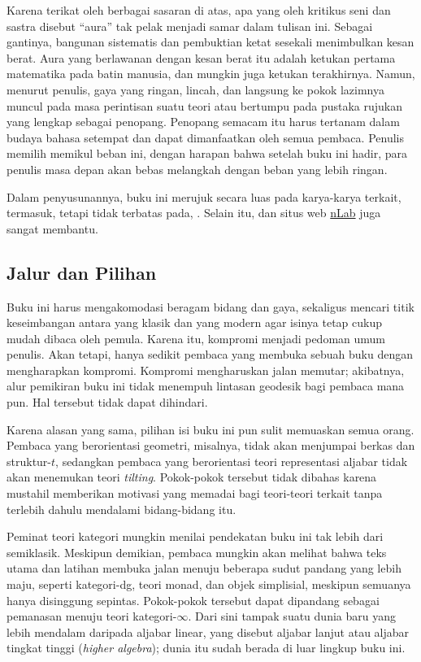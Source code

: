 Karena terikat oleh berbagai sasaran di atas, apa yang oleh kritikus seni
dan sastra disebut ``aura'' tak pelak menjadi samar dalam tulisan ini. Sebagai
gantinya, bangunan sistematis dan pembuktian ketat sesekali menimbulkan
kesan berat. Aura yang berlawanan dengan kesan berat itu adalah
ketukan pertama matematika pada batin manusia, dan mungkin juga ketukan
terakhirnya. Namun, menurut penulis, gaya yang ringan, lincah, dan langsung
ke pokok lazimnya muncul pada masa perintisan suatu teori atau bertumpu
pada pustaka rujukan yang lengkap sebagai penopang. Penopang semacam itu
harus tertanam dalam budaya bahasa setempat dan dapat dimanfaatkan oleh
semua pembaca. Penulis memilih memikul beban ini, dengan harapan bahwa
setelah buku ini hadir, para penulis masa depan akan bebas melangkah
dengan beban yang lebih ringan.

Dalam penyusunannya, buku ini merujuk secara luas pada karya-karya terkait,
termasuk, tetapi tidak terbatas pada, \cite{Wei94, ML98, KS06, Rie16, Yek20}.
Selain itu, \cite{stacks} dan situs web
\href{https://ncatlab.org}{nLab} juga sangat membantu.

\subsection*{Jalur dan Pilihan}

Buku ini harus mengakomodasi beragam bidang dan gaya, sekaligus mencari
titik keseimbangan antara yang klasik dan yang modern agar isinya tetap
cukup mudah dibaca oleh pemula. Karena itu, kompromi
menjadi pedoman umum penulis. Akan tetapi, hanya sedikit pembaca yang
membuka sebuah buku dengan mengharapkan kompromi. Kompromi mengharuskan jalan
memutar; akibatnya, alur pemikiran buku ini tidak menempuh lintasan
geodesik bagi pembaca mana pun. Hal tersebut tidak dapat dihindari.

Karena alasan yang sama, pilihan isi buku ini pun sulit memuaskan semua
orang. Pembaca yang berorientasi geometri, misalnya, tidak akan menjumpai
berkas dan struktur-$t$, sedangkan pembaca yang berorientasi teori
representasi aljabar tidak akan menemukan teori \emph{tilting}. Pokok-pokok
tersebut tidak dibahas karena mustahil memberikan motivasi yang memadai
bagi teori-teori terkait tanpa terlebih dahulu mendalami bidang-bidang itu.

Peminat teori kategori mungkin menilai pendekatan buku ini tak lebih dari
semiklasik. Meskipun demikian, pembaca mungkin akan melihat bahwa
teks utama dan latihan membuka jalan menuju beberapa sudut pandang yang
lebih maju,
seperti kategori-dg, teori monad, dan objek simplisial, meskipun semuanya
hanya disinggung sepintas. Pokok-pokok tersebut dapat dipandang sebagai
pemanasan menuju teori kategori-$\infty$. Dari sini tampak suatu dunia
baru yang lebih mendalam daripada aljabar linear, yang disebut aljabar
lanjut atau aljabar tingkat tinggi (\emph{higher algebra}); dunia itu sudah
berada di luar lingkup buku ini.

